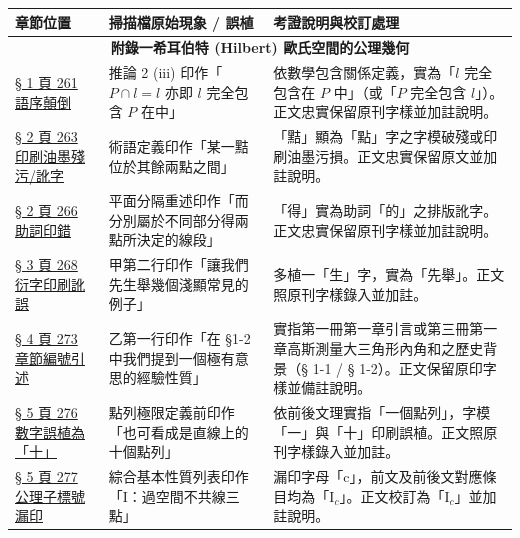 \documentclass[a4paper,12pt,twoside]{article}
\begin{document}
\begin{table}[H]
\centering
\small
\renewcommand{\arraystretch}{1.35}
\begin{tabularx}{\textwidth}{|p{3.2cm}|p{3.8cm}|X|}
\hline
\textbf{章節位置} & \textbf{掃描檔原始現象 / 誤植} & \textbf{考證說明與校訂處理} \\ \hline

\multicolumn{3}{|c|}{\textbf{附錄一\quad 希耳伯特 (Hilbert) 歐氏空間的公理幾何}} \\ \hline

\hyperref[note:b3-a1-p261-order]{§ 1 頁 261 語序顛倒} & 
推論 2 (iii) 印作「$P \cap l = l$ 亦即 $l$ 完全包含 $P$ 在中」 & 
依數學包含關係定義，實為「$l$ 完全包含在 $P$ 中」（或「$P$ 完全包含 $l$」）。正文忠實保留原刊字樣並加註說明。 \\ \hline

\hyperref[note:b3-a1-p263-point]{§ 2 頁 263 印刷油墨殘污/訛字} & 
術語定義印作「某一黠位於其餘兩點之間」 & 
「黠」顯為「點」字之字模破殘或印刷油墨污損。正文忠實保留原文並加註說明。 \\ \hline

\hyperref[note:b3-a1-p266-de]{§ 2 頁 266 助詞印錯} & 
平面分隔重述印作「而分別屬於不同部分得兩點所決定的線段」 & 
「得」實為助詞「的」之排版訛字。正文忠實保留原刊字樣並加註說明。 \\ \hline

\hyperref[note:b3-a1-p268-xian]{§ 3 頁 268 衍字印刷訛誤} & 
甲第二行印作「讓我們先生舉幾個淺顯常見的例子」 & 
多植一「生」字，實為「先舉」。正文照原刊字樣錄入並加註。 \\ \hline

\hyperref[note:b3-a1-p273-sec]{§ 4 頁 273 章節編號引述} & 
乙第一行印作「在 \S 1-2 中我們提到一個極有意思的經驗性質」 & 
實指第一冊第一章引言或第三冊第一章高斯測量大三角形內角和之歷史背景（§ 1-1 / § 1-2）。正文保留原印字樣並備註說明。 \\ \hline

\hyperref[note:b3-a1-p276-ten]{§ 5 頁 276 數字誤植為「十」} & 
點列極限定義前印作「也可看成是直線上的十個點列」 & 
依前後文理實指「一個點列」，字模「一」與「十」印刷誤植。正文照原刊字樣錄入並加註。 \\ \hline

\hyperref[note:b3-a1-p277-ic]{§ 5 頁 277 公理子標號漏印} & 
綜合基本性質列表印作「$\mathrm{I}$：過空間不共線三點」 & 
漏印字母「c」，前文及前後文對應條目均為「$\mathrm{I}_c$」。正文校訂為「$\mathrm{I}_c$」並加註說明。 \\ \hline


\end{tabularx}
\end{table}
\end{document}
